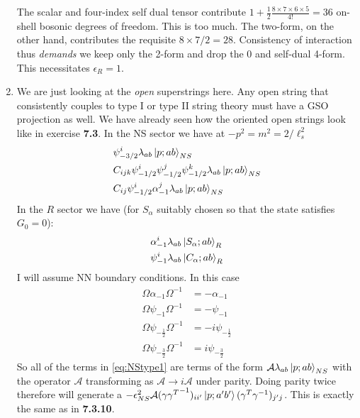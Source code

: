 \documentclass[11pt, class=article, crop=false]{standalone}
\begin{document}
\begin{enumerate}
	The scalar and four-index self dual tensor contribute $1 + \frac12 \frac{8 \times 7 \times 6 \times 5}{4!} = 36$ on-shell bosonic degrees of freedom. This is too much. The two-form, on the other hand, contributes the requisite $8 \times 7 / 2= 28$. Consistency of interaction thus \emph{demands} we keep only the 2-form and drop the 0 and self-dual 4-form. This necessitates $\epsilon_R = 1$.
	
	\item We are just looking at the \emph{open} superstrings here. Any open string that consistently couples to type I or type II string theory must have a GSO projection as well. We have already seen how the oriented open strings look like in exercise \textbf{7.3}. In the NS sector we have at $-p^2 = m^2 = 2/\ell_s^2$
	\begin{equation}\label{eq:NStype1}
		\begin{aligned}
			&\psi_{-3/2}^i \lambda_{ab} \ket{p; ab}_{NS}\\
			&C_{ijk} \psi_{-1/2}^i \psi_{-1/2}^j \psi_{-1/2}^k \lambda_{ab} \ket{p; ab}_{NS}\\
			&C_{ij} \psi_{-1/2}^i \alpha_{-1}^j \lambda_{ab} \ket{p; ab}_{NS}
		\end{aligned}
	\end{equation}
	 In the $R$ sector we have (for $S_\alpha$ suitably chosen so that the state satisfies $G_0 = 0$):
	 \begin{equation}\label{eq:Rtype1}
	 	\begin{aligned}
	 		& \alpha_{-1}^i \lambda_{ab} \ket{S_\alpha; ab}_{R}\\
			& \psi_{-1}^i \lambda_{ab} \ket{C_\alpha; ab}_{R}
	 	\end{aligned}
	 \end{equation}
	I will assume NN boundary conditions. In this case
	\[
	\begin{aligned}
		\Omega \alpha_{-1} \Omega^{-1} &= - \alpha_{-1}\\
		\Omega \psi_{-1} \Omega^{-1} &= - \psi_{-1}\\
		\Omega \psi_{-\frac12} \Omega^{-1} &= -i \psi_{-\frac12}\\
		\Omega \psi_{-\frac32} \Omega^{-1} &= i \psi_{-\frac32}
	\end{aligned}
	\]
	So all of the terms in \eqref{eq:NStype1} are terms of the form $\mathcal A \lambda_{ab} \ket{p; ab}_{NS}$ with the operator $\mathcal A$ transforming as $\mathcal A \to i \mathcal A$ under parity. Doing parity twice therefore will generate a $- \epsilon_{NS}^2 \mathcal A (\gamma {\gamma^T}^{-1})_{ii'} \ket{p; a'b'} (\gamma^T {\gamma}^{-1})_{j'j}$. This is exactly the same as in \textbf{7.3.10}.  %

\end{enumerate}
\end{document}
